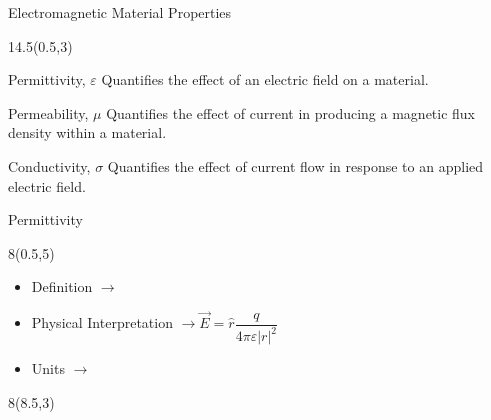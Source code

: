 %
\begin{frame}{Electromagnetic Material Properties}
		\begin{textblock}{14.5}(0.5,3)
			\begin{myblock}[0.9]{Permittivity, $\varepsilon$}
				Quantifies the effect of an electric field on a material. 
			\end{myblock}
			
			\begin{myblock}[0.9]{Permeability, $\mu$}
				Quantifies the effect of current in producing a magnetic flux density within a material.
			\end{myblock}

			\begin{myblock}[0.9]{Conductivity, $\sigma$}
				Quantifies the effect of current flow in response to an applied electric field. 
			\end{myblock}
		\end{textblock}
\end{frame}


\begin{frame}{Permittivity}
	\begin{textblock}{8}(0.5,5)
	\begin{itemize}
		\setlength\itemsep{32pt}
		\item Definition $\longrightarrow$ 
		
		\item Physical Interpretation $\longrightarrow \vec{E} = \hat{r} \dfrac{q}{4\pi \varepsilon |r|^2}$
		
		\item Units $\longrightarrow$ 
	\end{itemize}
	\end{textblock}
	\begin{textblock}{8}(8.5,3)
	\scalebox{0.65}{
		
		}
	\end{textblock}
\end{frame}


